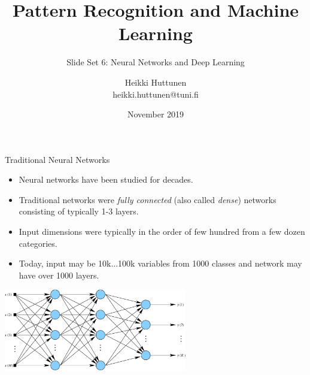 \documentclass[10pt, aspectratio=169]{beamer} %
\title{Pattern Recognition and Machine Learning}
\subtitle{Slide Set 6: Neural Networks and Deep Learning}
\author{Heikki Huttunen\\
heikki.huttunen@tuni.fi}
\institute{Signal Processing\\Tampere University}
\date{November 2019}
\begin{document}
\maketitle


\lstset{language=Python,style=mystyle} 



\begin{frame}{Traditional Neural Networks}
	
	\begin{itemize}
		\item Neural networks have been studied for decades.
		\item Traditional networks were \emph{fully connected} (also called \emph{dense}) networks consisting of typically 1-3 layers.
		\item Input dimensions were typically in the order of few hundred from a few dozen categories.
		\item Today, input may be 10k...100k variables from 1000 classes and network may have over 1000 layers.
	\end{itemize}
	\centering
	\includegraphics[width=0.6\textwidth]{VanillaNeuralNet.pdf}

\end{frame}
\end{document}
